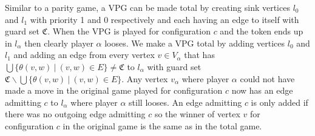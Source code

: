 Similar to a parity game, a VPG can be made total by creating sink vertices $l_0$ and $l_1$ with priority 1 and 0 respectively and each having an edge to itself with guard set $\mathfrak{C}$. When the VPG is played for configuration $c$ and the token ends up in $l_\alpha$ then clearly player $\alpha$ looses. We make a VPG total by adding vertices $l_0$ and $l_1$ and adding an edge from every vertex $v \in V_\alpha$ that has $\bigcup \{ \theta(v,w)\ |\ (v,w) \in E \} \neq \mathfrak{C}$ to $l_\alpha$ with guard set $\mathfrak{C} \backslash \bigcup \{ \theta(v,w)\ |\ (v,w) \in E \}$. Any vertex $v_\alpha$ where player $\alpha$ could not have made a move in the original game played for configuration $c$ now has an edge admitting $c$ to $l_\alpha$ where player $\alpha$ still looses. An edge admitting $c$ is only added if there was no outgoing edge admitting $c$ so the winner of vertex $v$ for configuration $c$ in the original game is the same as in the total game.

